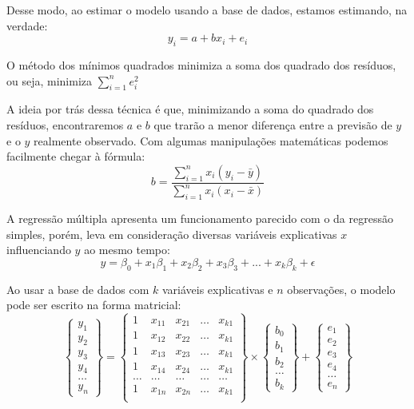 Desse modo, ao estimar o modelo usando a base de dados, estamos estimando, na verdade:
\begin{equation}
	y_i = a + bx_i + e_i
\end{equation}

O método dos mínimos quadrados minimiza a soma dos quadrado dos resíduos, ou seja, minimiza $\sum_{i=1}^{n}e^2_i$

A ideia por trás dessa técnica é que, minimizando a soma do quadrado dos resíduos, encontraremos $a$ e $b$ que trarão a menor diferença entre a previsão de $y$ e o $y$ realmente observado.
Com algumas manipulações matemáticas podemos facilmente chegar à fórmula:
\begin{equation}
	b=\frac{\sum_{i=1}^{n}x_i(y_i-\bar{y})}{\sum_{i=1}^{n}x_i(x_i-\bar{x})}
\end{equation}

A regressão múltipla apresenta um funcionamento parecido com o da regressão simples, porém, leva em consideração diversas variáveis explicativas $x$ influenciando $y$ ao mesmo tempo:
\begin{equation}
	y = \beta_0 + x_1\beta_1 + x_2\beta_2 + x_3\beta_3 + ... + x_k\beta_k + \epsilon
\end{equation}

Ao usar a base de dados com $k$ variáveis explicativas e $n$ observações, o modelo pode ser escrito na forma matricial:
\begin{equation}
\begin{Bmatrix}
y_1 \\
y_2 \\
y_3 \\
y_4 \\
\dots \\
y_n 
\end{Bmatrix}
=
\begin{Bmatrix}
1 & x_{11} & x_{21} & \dots & x_{k1} \\
1 & x_{12} & x_{22} & \dots & x_{k1} \\
1 & x_{13} & x_{23} & \dots & x_{k1} \\
1 & x_{14} & x_{24} & \dots & x_{k1} \\
\dots & \dots & \dots & \dots & \dots \\
1 & x_{1n} & x_{2n} & \dots & x_{k1} \\
\end{Bmatrix}
\times
\begin{Bmatrix}
b_0 \\
b_1 \\
b_2 \\
\dots \\
b_k
\end{Bmatrix}
+
\begin{Bmatrix}
e_1 \\
e_2 \\
e_3 \\
e_4 \\
\dots \\
e_n
\end{Bmatrix}
\end{equation}

